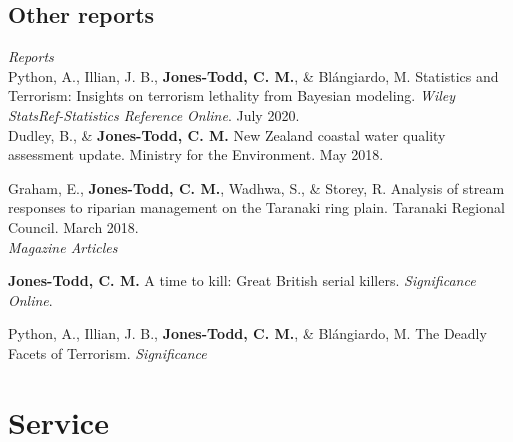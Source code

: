 \documentclass[10pt,a4paper]{moderncv}
\begin{document}
\subsection{Other reports}

\vspace{5pt}

\textit{\small{Reports}}\\

Python, A.,  Illian, J. B., \textbf{Jones-Todd, C. M.}, \& Bl\'{a}ngiardo, M. Statistics and Terrorism: Insights on terrorism lethality from Bayesian modeling. \textit{Wiley StatsRef-Statistics Reference Online}. July 2020.\\

Dudley, B., \& \textbf{Jones-Todd, C. M.} New Zealand coastal water quality assessment update. Ministry for the Environment. May 2018.

\vspace{5pt}

Graham, E., \textbf{Jones-Todd, C. M.}, Wadhwa, S., \& Storey, R. Analysis of stream responses to riparian management on the Taranaki ring plain. Taranaki Regional Council. March 2018.\\


\textit{\small{Magazine Articles}}\\

\vspace{-3pt}

\textbf{Jones-Todd, C. M.} A time to kill: Great British serial killers. \textit{Significance Online}. \\

\vspace{-3pt}

Python, A.,  Illian, J. B., \textbf{Jones-Todd, C. M.}, \& Bl\'{a}ngiardo, M. The Deadly Facets of Terrorism. \textit{Significance}\\

\vspace{5pt}

\newpage
\section{Service}
\vspace{6pt}
\end{document}
